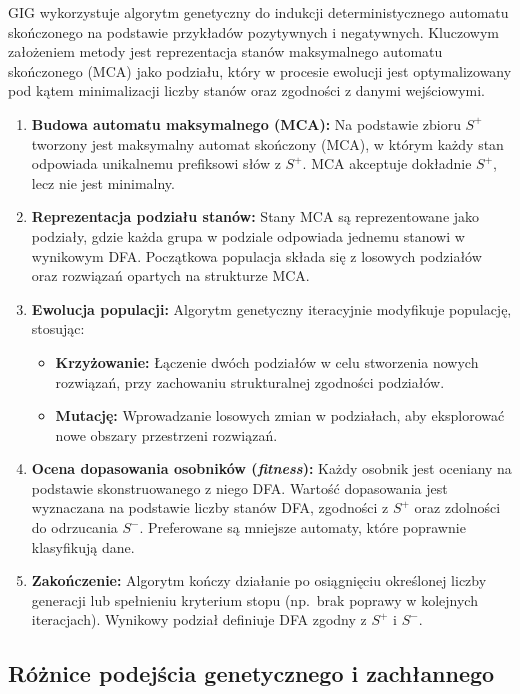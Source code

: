 GIG wykorzystuje algorytm genetyczny do indukcji deterministycznego automatu skończonego na podstawie przykładów pozytywnych i negatywnych. Kluczowym założeniem metody jest reprezentacja stanów maksymalnego automatu skończonego (MCA) jako podziału, który w procesie ewolucji jest optymalizowany pod kątem minimalizacji liczby stanów oraz zgodności z danymi wejściowymi.
\begin{enumerate}
    \item \textbf{Budowa automatu maksymalnego (MCA):}
        Na podstawie zbioru \( S^+ \) tworzony jest maksymalny automat skończony (MCA), w którym każdy stan odpowiada unikalnemu prefiksowi słów z \( S^+ \). MCA akceptuje dokładnie \( S^+ \), lecz nie jest minimalny.
    \item \textbf{Reprezentacja podziału stanów:}
        Stany MCA są reprezentowane jako podziały, gdzie każda grupa w podziale odpowiada jednemu stanowi w wynikowym DFA. Początkowa populacja składa się z losowych podziałów oraz rozwiązań opartych na strukturze MCA.
    \item \textbf{Ewolucja populacji:}
        Algorytm genetyczny iteracyjnie modyfikuje populację, stosując:
        \begin{itemize}
            \item \textbf{Krzyżowanie:} Łączenie dwóch podziałów w celu stworzenia nowych rozwiązań, przy zachowaniu strukturalnej zgodności podziałów.
            \item \textbf{Mutację:} Wprowadzanie losowych zmian w podziałach, aby eksplorować nowe obszary przestrzeni rozwiązań.
        \end{itemize}
    \item \textbf{Ocena dopasowania osobników (\textit{fitness}):}
        Każdy osobnik jest oceniany na podstawie skonstruowanego z niego DFA. Wartość dopasowania jest wyznaczana na podstawie liczby stanów DFA, zgodności z \( S^+ \) oraz zdolności do odrzucania \( S^- \). Preferowane są mniejsze automaty, które poprawnie klasyfikują dane.
    \item \textbf{Zakończenie:}
        Algorytm kończy działanie po osiągnięciu określonej liczby generacji lub spełnieniu kryterium stopu (np.\ brak poprawy w kolejnych iteracjach). Wynikowy podział definiuje DFA zgodny z \( S^+ \) i \( S^- \).
\end{enumerate}

\subsection{Różnice podejścia genetycznego i zachłannego}

